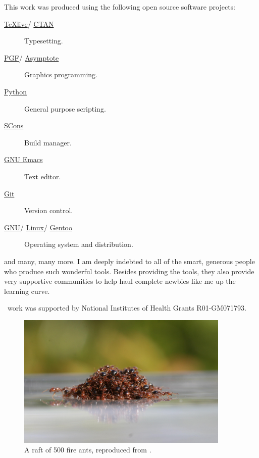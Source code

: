\begin{acknowledgments}
This work was produced using the following open source software projects:
\begin{description}
\item[\href{http://www.tug.org/texlive/}{\TeX live}/%
      \href{http://www.ctan.org/}{CTAN}]
  Typesetting.
\item[\href{http://sourceforge.net/projects/pgf/}{PGF}/%
      \href{http://asymptote.sourceforge.net/}{Asymptote}]
  Graphics programming.
\item[\href{http://www.python.org/}{Python}]
  General purpose scripting.
\item[\href{http://www.scons.org/}{SCons}]
  Build manager.
\item[\href{http://www.gnu.org/software/emacs/}{GNU Emacs}]
  Text editor.
\item[\href{http://git-scm.com/}{Git}]
  Version control.
\item[\href{http://www.gnu.org/}{GNU}/%
      \href{https://www.kernel.org/}{Linux}/%
      \href{http://www.gentoo.org/}{Gentoo}]
  Operating system and distribution.
\end{description}
and many, many more.  I am deeply indebted to all of the smart,
generous people who produce such wonderful tools.  Besides providing
the tools, they also provide very supportive communities to help haul
complete newbies like me up the learning curve.

\sawsim\ work was supported by National Institutes of Health Grants
R01-GM071793.

\begin{figure}
  \begin{center}
    \includegraphics[width=4in]{figures/binary/ants}
    \caption{A raft of 500 fire ants, reproduced from
      \citet{mlot11}.\label{fig:ants}}
    \end{center}
\end{figure}
\end{acknowledgments}
